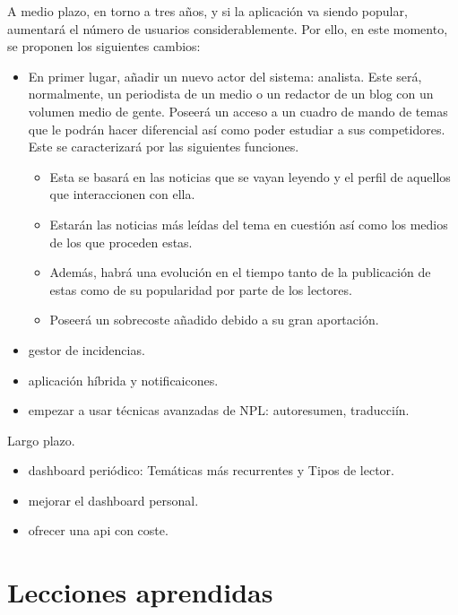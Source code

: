 A medio plazo, en torno a tres años, y si la aplicación va siendo popular, aumentará el número de usuarios considerablemente. Por ello, en este momento, se proponen los siguientes cambios:

\begin{itemize}
    \item En primer lugar, añadir un nuevo actor del sistema: analista. Este será, normalmente, un periodista de un medio o un redactor de un blog con un volumen medio de gente. Poseerá un acceso a un cuadro de mando de temas que le podrán hacer diferencial así como poder estudiar a sus competidores. Este se caracterizará por las siguientes funciones.
    \begin{itemize}
        \item Esta se basará en las noticias que se vayan leyendo y el perfil de aquellos que interaccionen con ella.
        \item Estarán las noticias más leídas del tema en cuestión así como los medios de los que proceden estas.
        \item Además, habrá una evolución en el tiempo tanto de la publicación de estas como de su popularidad por parte de los lectores.
        \item Poseerá un sobrecoste añadido debido a su gran aportación.
    \end{itemize}
    \item gestor de incidencias.
    \item aplicación híbrida y notificaicones.
    \item empezar a usar técnicas avanzadas de NPL: autoresumen, traducciín.
\end{itemize}

Largo plazo.

\begin{itemize}
    \item dashboard periódico: Temáticas más recurrentes y Tipos de lector.
    \item mejorar el dashboard personal.
    \item ofrecer una api con coste.
\end{itemize}

\section{Lecciones aprendidas}\label{sec:lecciones_aprendidas}